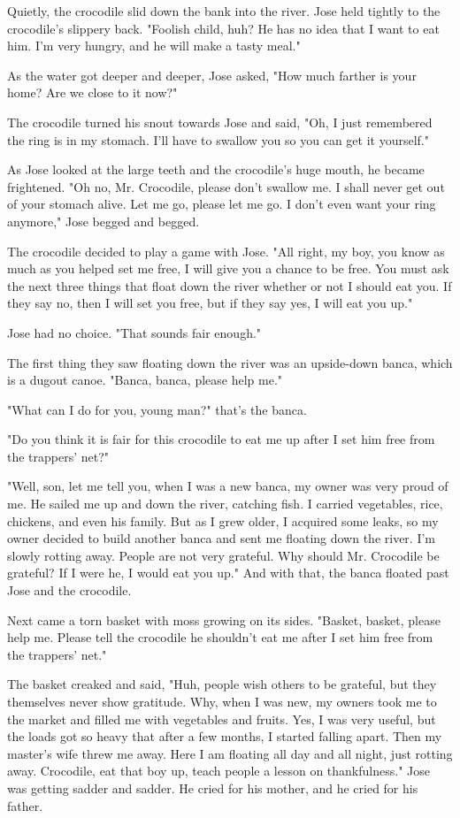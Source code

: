 Quietly, the crocodile slid down the bank into the river. Jose held tightly to the crocodile's slippery back. "Foolish child, huh? He has no idea that I want to eat him. I'm very hungry, and he will make a tasty meal."

As the water got deeper and deeper, Jose asked, "How much farther is your home? Are we close to it now?"

The crocodile turned his snout towards Jose and said, "Oh, I just remembered the ring is in my stomach. I'll have to swallow you so you can get it yourself."

As Jose looked at the large teeth and the crocodile's huge mouth, he became frightened. "Oh no, Mr. Crocodile, please don't swallow me. I shall never get out of your stomach alive. Let me go, please let me go. I don't even want your ring anymore," Jose begged and begged.

The crocodile decided to play a game with Jose. "All right, my boy, you know as much as you helped set me free, I will give you a chance to be free. You must ask the next three things that float down the river whether or not I should eat you. If they say no, then I will set you free, but if they say yes, I will eat you up."

Jose had no choice. "That sounds fair enough."

The first thing they saw floating down the river was an upside-down banca, which is a dugout canoe. "Banca, banca, please help me."

"What can I do for you, young man?" that's the banca.

"Do you think it is fair for this crocodile to eat me up after I set him free from the trappers' net?"

"Well, son, let me tell you, when I was a new banca, my owner was very proud of me. He sailed me up and down the river, catching fish. I carried vegetables, rice, chickens, and even his family. But as I grew older, I acquired some leaks, so my owner decided to build another banca and sent me floating down the river. I'm slowly rotting away. People are not very grateful. Why should Mr. Crocodile be grateful? If I were he, I would eat you up." And with that, the banca floated past Jose and the crocodile.

Next came a torn basket with moss growing on its sides. "Basket, basket, please help me. Please tell the crocodile he shouldn't eat me after I set him free from the trappers' net."

The basket creaked and said, "Huh, people wish others to be grateful, but they themselves never show gratitude. Why, when I was new, my owners took me to the market and filled me with vegetables and fruits. Yes, I was very useful, but the loads got so heavy that after a few months, I started falling apart. Then my master's wife threw me away. Here I am floating all day and all night, just rotting away. Crocodile, eat that boy up, teach people a lesson on thankfulness." Jose was getting sadder and sadder. He cried for his mother, and he cried for his father.

